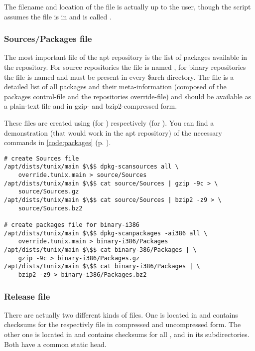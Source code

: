 The filename and location of the file is actually up to the user, though the
script  assumes the file is in 
and is called .

\subsubsection{Sources/Packages file}
The most important file of the apt repository is the list of packages available
in the repository. For source repositories the file is named , for
binary repositories the file is named  and must be present in
every \$arch directory. The file is a detailed list of all packages and their
meta-information (composed of the packages control-file and the repositories
override-file) and should be available as a plain-text file and in gzip-
and bzip2-compressed form.

These files are created using  (for ) 
respectively  (for ). You can find a
demonstration (that would work in the \tunix{} apt repository) of the necessary
commands in \lstlistingname{} \ref{code:packages} (p. \pageref{code:packages}).

\begin{lstlisting}[label=code:packages,caption=Creating Sources and Packages
files,float=ht]
# create Sources file
/apt/dists/tunix/main $\$$ dpkg-scansources all \
	override.tunix.main > source/Sources
/apt/dists/tunix/main $\$$ cat source/Sources | gzip -9c > \
	source/Sources.gz
/apt/dists/tunix/main $\$$ cat source/Sources | bzip2 -z9 > \
	source/Sources.bz2

# create packages file for binary-i386
/apt/dists/tunix/main $\$$ dpkg-scanpackages -ai386 all \
	override.tunix.main > binary-i386/Packages
/apt/dists/tunix/main $\$$ cat binary-386/Packages | \
	gzip -9c > binary-i386/Packages.gz
/apt/dists/tunix/main $\$$ cat binary-i386/Packages | \
	bzip2 -z9 > binary-i386/Packages.bz2
\end{lstlisting}

\subsubsection{Release file}
There are actually two different kinds of  files. One is located in
\file{dists/\$dist/\$comp/\$arch/} and contains checksums for the
\file{Packages} respectivly  file in compressed and uncompressed
form. The other one is located in  and contains checksums for all
,  and  in its subdirectories. Both
have a common static head. 


